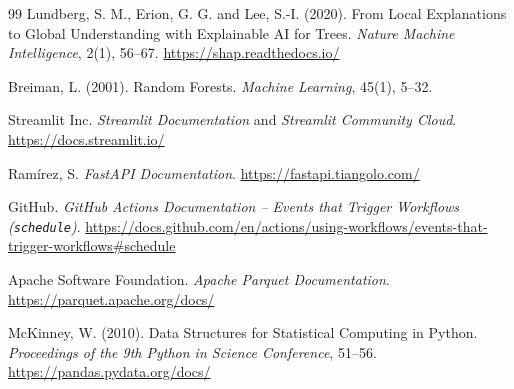 \documentclass[11pt,a4paper]{article}
\begin{document}
\begin{thebibliography}{99}
Lundberg, S. M., Erion, G. G. and Lee, S.-I. (2020). From Local Explanations to
Global Understanding with Explainable AI for Trees.
\emph{Nature Machine Intelligence}, 2(1), 56--67.
\url{https://shap.readthedocs.io/}

Breiman, L. (2001). Random Forests. \emph{Machine Learning}, 45(1), 5--32.

Streamlit Inc. \emph{Streamlit Documentation} and
\emph{Streamlit Community Cloud}.
\url{https://docs.streamlit.io/}

Ram\'irez, S. \emph{FastAPI Documentation}.
\url{https://fastapi.tiangolo.com/}

GitHub. \emph{GitHub Actions Documentation -- Events that Trigger Workflows
(\texttt{schedule})}.
\url{https://docs.github.com/en/actions/using-workflows/events-that-trigger-workflows#schedule}

Apache Software Foundation. \emph{Apache Parquet Documentation}.
\url{https://parquet.apache.org/docs/}

McKinney, W. (2010). Data Structures for Statistical Computing in Python.
\emph{Proceedings of the 9th Python in Science Conference}, 51--56.
\url{https://pandas.pydata.org/docs/}

\end{thebibliography}
\end{document}
